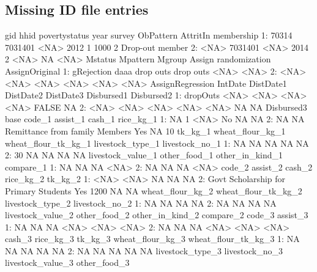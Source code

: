 \subsection{Missing ID file entries}


\begin{Schunk}
\begin{Soutput}
     gid    hhid povertystatus year survey ObPattern AttritIn      membership
1: 70314 7031401          <NA> 2012      1      1000        2 Drop-out member
2:  <NA> 7031401          <NA> 2014      2      <NA>       NA            <NA>
      Mstatus Mpattern    Mgroup    Assign randomization AssignOriginal
1: gRejection     daaa drop outs drop outs          <NA>           <NA>
2:       <NA>     <NA>      <NA>      <NA>          <NA>           <NA>
   AssignRegression IntDate DistDate1 DistDate2 DistDate3 Disbursed1 Disbursed2
1:         dropOuts    <NA>      <NA>      <NA>      <NA>      FALSE         NA
2:             <NA>    <NA>      <NA>      <NA>      <NA>         NA         NA
   Disbursed3 base                         code_1 assist_1 cash_1 rice_kg_1
1:         NA    1                           <NA>       No     NA        NA
2:         NA   NA Remittance from family Members      Yes     NA        10
   tk_kg_1 wheat_flour_kg_1 wheat_flour_tk_kg_1 livestock_type_1 livestock_no_1
1:      NA               NA                  NA               NA             NA
2:      30               NA                  NA               NA             NA
   livestock_value_1 other_food_1 other_in_kind_1 compare_1
1:                NA           NA              NA      <NA>
2:                NA           NA              NA      <NA>
                                  code_2 assist_2 cash_2 rice_kg_2 tk_kg_2
1:                                  <NA>     <NA>     NA        NA      NA
2: Govt Scholarship for Primary Students      Yes   1200        NA      NA
   wheat_flour_kg_2 wheat_flour_tk_kg_2 livestock_type_2 livestock_no_2
1:               NA                  NA               NA             NA
2:               NA                  NA               NA             NA
   livestock_value_2 other_food_2 other_in_kind_2 compare_2 code_3 assist_3
1:                NA           NA              NA      <NA>   <NA>     <NA>
2:                NA           NA              NA      <NA>   <NA>     <NA>
   cash_3 rice_kg_3 tk_kg_3 wheat_flour_kg_3 wheat_flour_tk_kg_3
1:     NA        NA      NA               NA                  NA
2:     NA        NA      NA               NA                  NA
   livestock_type_3 livestock_no_3 livestock_value_3 other_food_3

\end{Soutput}
\end{Schunk}
